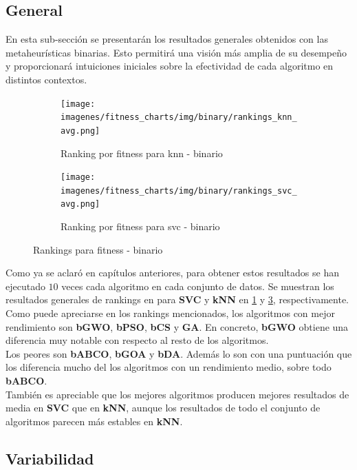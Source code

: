 \subsection{General}
En esta sub-sección se presentarán los resultados generales obtenidos con las metaheurísticas binarias. Esto permitirá una visión más amplia de su desempeño y proporcionará intuiciones iniciales sobre la efectividad de cada algoritmo en distintos contextos.

\begin{figure}[htp]
    \centering
    \begin{subfigure}[htp]{1\textwidth}
        \texttt{[image: imagenes/fitness\_charts/img/binary/rankings\_knn\_avg.png]}
        \caption{Ranking por fitness para knn - binario}
        \label{fig:ranking_knn}
    \end{subfigure}
    \begin{subfigure}[htp]{1\textwidth}
        \texttt{[image: imagenes/fitness\_charts/img/binary/rankings\_svc\_avg.png]}
        \caption{Ranking por fitness para svc - binario}
        \label{fig:ranking_svc}
    \end{subfigure}
    \caption{Rankings para fitness - binario}
\end{figure}

Como ya se aclaró en capítulos anteriores, para obtener estos resultados se han ejecutado $10$ veces cada algoritmo en cada conjunto de datos. Se muestran los resultados generales de rankings en para \textbf{SVC} y \textbf{kNN} en \ref{fig:ranking_knn} y \ref{fig:ranking_svc}, respectivamente.\\[6pt]
Como puede apreciarse en los rankings mencionados, los algoritmos con mejor rendimiento son \textbf{bGWO}, \textbf{bPSO}, \textbf{bCS} y \textbf{GA}. En concreto, \textbf{bGWO} obtiene una diferencia muy notable con respecto al resto de los algoritmos.\\[6pt]
Los peores son \textbf{bABCO}, \textbf{bGOA} y \textbf{bDA}. Además lo son con una puntuación que los diferencia mucho del los algoritmos con un rendimiento medio, sobre todo \textbf{bABCO}.\\[6pt]
También es apreciable que los mejores algoritmos producen mejores resultados de media en \textbf{SVC} que en \textbf{kNN}, aunque los resultados de todo el conjunto de algoritmos parecen más estables en \textbf{kNN}.

\subsection{Variabilidad}

